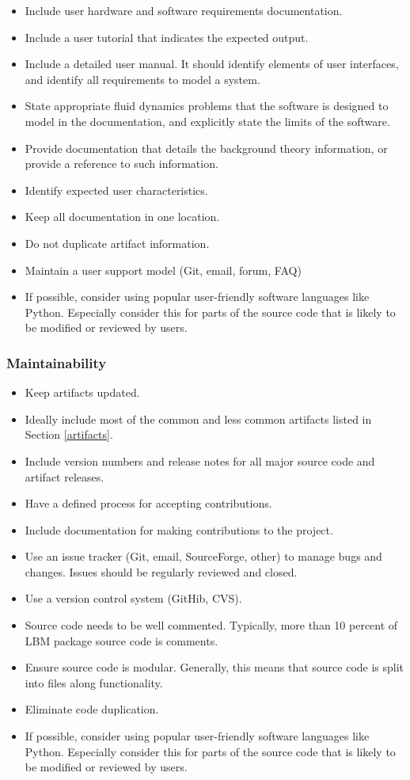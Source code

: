 \documentclass[12pt, notitlepage]{article}
\begin{document}
\begin{itemize}
	\item Include user hardware and software requirements documentation.
	\item Include a user tutorial that indicates the expected output.
	\item Include a detailed user manual. It should identify elements of user interfaces, and identify all requirements to model a system.	
	\item State appropriate fluid dynamics problems that the software is designed to model in the documentation, and explicitly state the limits of the software. 
	\item Provide documentation that details the background theory information, or provide a reference to such information.
	\item Identify expected user characteristics.
	\item Keep all documentation in one location.
	\item Do not duplicate artifact information.
	\item Maintain a user support model (Git, email, forum, FAQ)
	\item If possible, consider using popular user-friendly software languages like Python. Especially consider this for parts of the source code that is likely to be modified or reviewed by users.
\end{itemize}

\subsubsection{Maintainability}

\begin{itemize}
	\item Keep artifacts updated.
	\item Ideally include most of the common and less common artifacts listed in Section \ref{artifacts}.
	\item Include version numbers and release notes for all major source code and artifact releases. 
	\item Have a defined process for accepting contributions.
	\item Include documentation for making contributions to the project. 
	\item Use an issue tracker (Git, email, SourceForge, other) to manage bugs and changes. Issues should be regularly reviewed and closed. 
	\item Use a version control system (GitHib, CVS).
	\item Source code needs to be well commented. Typically, more than 10 percent of LBM package source code is comments. 
	\item Ensure source code is modular. Generally, this means that source code is split into files along functionality.
	\item Eliminate code duplication.
	\item If possible, consider using popular user-friendly software languages like Python. Especially consider this for parts of the source code that is likely to be modified or reviewed by users.
\end{itemize}
\end{document}
